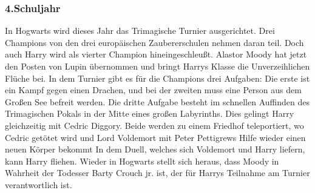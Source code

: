 \documentclass[a4paper, 10pt]{article}
\begin{document}
\subsubsection*{\large 4.Schuljahr}
In Hogwarts wird dieses Jahr das Trimagische Turnier ausgerichtet. Drei Champions von den drei europäischen Zaubererschulen nehmen daran teil. Doch auch Harry wird als vierter Champion hineingeschleußt.
\vspace{10pt}
\newline
{}  
Alastor Moody hat jetzt den Posten von Lupin übernommen und bringt Harrys Klasse die Unverzeihlichen Flüche bei.
\vspace{10pt}
\newline
{}  
In dem Turnier gibt es für die Champions drei Aufgaben: Die erste ist ein Kampf gegen einen Drachen, und bei der zweiten muss eine Person aus dem Großen See befreit werden. Die dritte Aufgabe besteht im schnellen Auffinden des Trimagischen Pokals in der Mitte eines großen Labyrinths. Dies gelingt Harry gleichzeitig mit Cedric Diggory. Beide werden zu einem Friedhof teleportiert, wo Cedric getötet wird und Lord Voldemort mit Peter Pettigrews Hilfe wieder einen neuen Körper bekommt
\vspace{10pt}
\newline
{}  
In dem Duell, welches sich Voldemort und Harry liefern, kann Harry fliehen. Wieder in Hogwarts stellt sich heraus, dass Moody in Wahrheit der Todesser Barty Crouch jr. ist, der für Harrys Teilnahme am Turnier verantwortlich ist.
\end{document}
